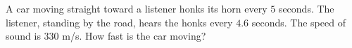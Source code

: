 A car moving straight toward a listener honks its horn every $5$ seconds. The listener, standing by the road, hears the honks every $4.6$ seconds. The speed of sound is $330$ m/s. How fast is the car moving?
